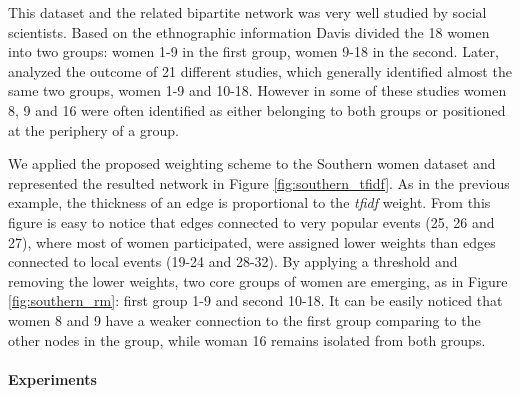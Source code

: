 This dataset and the related bipartite network was very well studied by social
scientists. Based on the ethnographic information Davis divided the 18 women
into two groups: women 1-9 in the first group, women 9-18 in the second.
Later, \citet{freeman2003finding} analyzed the outcome of 21 different
studies, which generally identified almost the same two groups, women 1-9 and
10-18. However in some of these studies women 8, 9 and 16 were often identified
as either belonging to both groups or positioned at the periphery of a group.

We applied the proposed weighting scheme to the Southern women dataset and
represented the resulted network in Figure \ref{fig:southern_tfidf}. As in the
previous example, the thickness of an edge is proportional to the \emph{tfidf}
weight. From this figure is easy to notice that edges connected to very popular
events (25, 26 and 27), where most of women participated, were assigned lower
weights than edges connected to local events (19-24 and 28-32). By applying a
threshold and removing the lower weights, two core groups of women are emerging,
as in Figure \ref{fig:southern_rm}: first group 1-9 and second 10-18. It can be
easily noticed that women 8 and 9 have a weaker connection to the first group
comparing to the other nodes in the group, while woman 16 remains isolated from
both groups.

\paragraph{Experiments}

